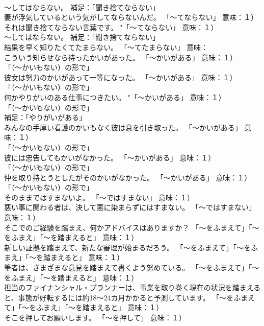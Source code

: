 \documentclass[8pt]{extreport}
\begin{document}
\begin{CJK}{UTF8}{min}
\\	～してはならない。 補足：「聞き捨てならない」 
\\	妻が浮気しているという気がしてならないんだ。	「～てならない」 意味：１）
\\	それは聞き捨てならない言葉です。	"「～てならない」 意味：１）
\\	～してはならない。 補足：「聞き捨てならない」 
\\	結果を早く知りたくてたまらない。	「～てたまらない」 意味：
\\	こういう知らせなら待ったかいがあった。	「～かいがある」 意味：１）
\\	「（～かいもない）の形で」
\\	彼女は努力のかいがあって一等になった。	「～かいがある」 意味：１）
\\	「（～かいもない）の形で」
\\	何かやりがいのある仕事につきたい。	"「～かいがある」 意味：１）
\\	「（～かいもない）の形で」
\\	補足：「やりがいがある」
\\	みんなの手厚い看護のかいもなく彼は息を引き取った。	「～かいがある」 意味：１）
\\	「（～かいもない）の形で」
\\	彼には忠告してもかいがなかった。	「～かいがある」 意味：１）
\\	「（～かいもない）の形で」
\\	仲を取り持とうとしたがそのかいがなかった。	「～かいがある」 意味：１）
\\	「（～かいもない）の形で」
\\	そのままではすまないよ。	「～ではすまない」 意味：１）
\\	悪い事に関わる者は、決して悪に染まらずにはすまない。	「～ではすまない」 意味：１）
\\	そこでのご経験を踏まえ、何かアドバイスはありますか？	「～をふまえて」「～をふまえ」「～を踏まえると」 意味：１）
\\	新しい証拠を踏まえて、新たな審理が始まるだろう。	「～をふまえて」「～をふまえ」「～を踏まえると」 意味：１）
\\	筆者は、さまざまな意見を踏まえて書くよう努めている。	「～をふまえて」「～をふまえ」「～を踏まえると」 意味：１）
\\	担当のファイナンシャル・プランナーは、事業を取り巻く現在の状況を踏まえると、事態が好転するには約18～24カ月かかると予測しています。	「～をふまえて」「～をふまえ」「～を踏まえると」 意味：１）
\\	そこを押してお願いします。	「～を押して」 意味：１）

\end{CJK}
\end{document}

